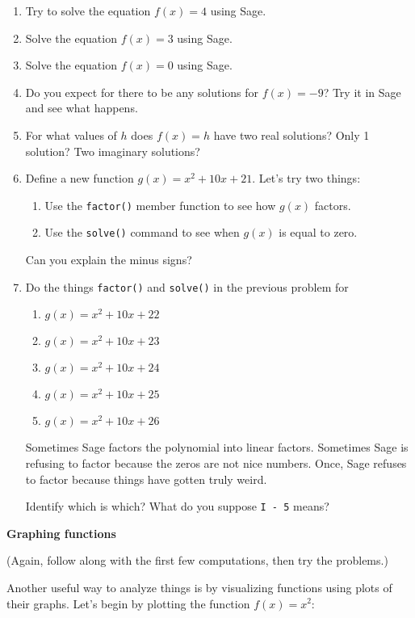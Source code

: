 \begin{enumerate}
	\item Try to solve the equation $f(x)=4$ using Sage.
	\item Solve the equation $f(x)=3$ using Sage.
	\item Solve the equation $f(x)=0$ using Sage.
	\item Do you expect for there to be any solutions for $f(x)=-9$?
		Try it in Sage and see what happens.
	\item For what values of $h$ does $f(x)=h$ have two real solutions?
		Only 1 solution? Two imaginary solutions?
	\item Define a new function $g(x) = x^2 + 10x + 21$.  Let's try two things:
	\begin{enumerate}
		\item Use the \verb+factor()+ member function to see how $g(x)$ factors.
		\item Use the \verb+solve()+ command to see when $g(x)$ is equal to zero.
	\end{enumerate}
	Can you explain the minus signs?

	\item Do the things \verb+factor()+ and \verb+solve()+ in the previous problem for 
	\begin{enumerate}
		\item $g(x) = x^2 + 10x + 22$
		\item $g(x) = x^2 + 10x + 23$
		\item $g(x) = x^2 + 10x + 24$
		\item $g(x) = x^2 + 10x + 25$
		\item $g(x) = x^2 + 10x + 26$
	\end{enumerate}

    Sometimes Sage factors the polynomial into linear factors. \newline
    Sometimes Sage is refusing to factor because the zeros are not nice numbers.\newline
    Once, Sage refuses to factor because things have gotten truly weird.

    Identify which is which?  What do you suppose \verb+I - 5+ means?

\end{enumerate}

{\bf \large Graphing functions}

(Again, follow along with the first few computations, then try the problems.)

Another useful way to analyze things is by visualizing functions using plots of their graphs. Let's begin by plotting the function $f(x)=x^2$:

